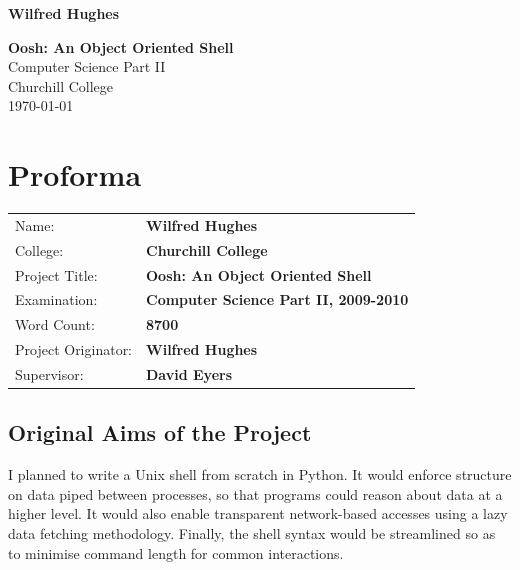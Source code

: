 \documentclass[12pt,twoside,notitlepage]{report}
\begin{document}





\pagestyle{empty}

\hfill{\LARGE \bf Wilfred Hughes}

\vspace*{60mm}
\begin{center}
\Huge
{\bf Oosh: An Object Oriented Shell} \\
\vspace*{5mm}
Computer Science Part II \\
\vspace*{5mm}
Churchill College \\
\vspace*{5mm}
\today  %
\end{center}

\cleardoublepage


\setcounter{page}{1}
\pagestyle{plain}

\chapter*{Proforma}

{\large
\begin{tabular}{ll}
Name:               & \bf Wilfred Hughes                       \\
College:            & \bf Churchill College                     \\
Project Title:      & \bf Oosh: An Object Oriented Shell \\
Examination:        & \bf Computer Science Part II, 2009-2010        \\
Word Count:         & \bf 8700 \\
Project Originator: & \bf Wilfred Hughes                    \\
Supervisor:         & \bf David Eyers                    \\ 
\end{tabular}
}

\section*{Original Aims of the Project}

I planned to write a Unix shell from scratch in Python. It would
enforce structure on data piped between processes, so that programs
could reason about data at a higher level. It would also enable
transparent network-based accesses using a lazy data fetching
methodology. Finally, the shell syntax would be streamlined so as to
minimise command length for common interactions.
\end{document}

